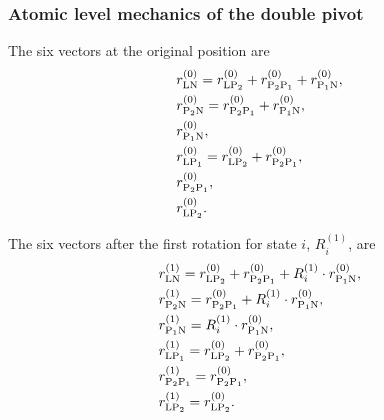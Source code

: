 
\subsubsection{Atomic level mechanics of the double pivot}

The six vectors at the original position are
\begin{subequations}
\begin{align}
    & r_{\textrm{LN}}^{(0)} = r_{\textrm{LP}_2}^{(0)} + r_{\textrm{P}_2 \textrm{P}_1}^{(0)} + r_{\textrm{P}_1 \textrm{N}}^{(0)}, \\
    & r_{\textrm{P}_2 \textrm{N}}^{(0)} = r_{\textrm{P}_2 \textrm{P}_1}^{(0)} + r_{\textrm{P}_1 \textrm{N}}^{(0)} , \\
    & r_{\textrm{P}_1 \textrm{N}}^{(0)}, \\
    & r_{\textrm{LP}_1}^{(0)} = r_{\textrm{LP}_2}^{(0)} + r_{\textrm{P}_2 \textrm{P}_1}^{(0)} , \\
    & r_{\textrm{P}_2 \textrm{P}_1}^{(0)}, \\
    & r_{\textrm{LP}_2}^{(0)} .
\end{align}
\end{subequations}

The six vectors after the first rotation for state $i$, $R_i^{(1)}$, are
\begin{subequations}
\begin{align}
    & r_{\textrm{LN}}^{(1)} = r_{\textrm{LP}_2}^{(0)} + r_{\textrm{P}_2 \textrm{P}_1}^{(0)} + R_i^{(1)} \cdot r_{\textrm{P}_1 \textrm{N}}^{(0)}, \\
    & r_{\textrm{P}_2 \textrm{N}}^{(1)} = r_{\textrm{P}_2 \textrm{P}_1}^{(0)} + R_i^{(1)} \cdot r_{\textrm{P}_1 \textrm{N}}^{(0)} , \\
    & r_{\textrm{P}_1 \textrm{N}}^{(1)} = R_i^{(1)} \cdot r_{\textrm{P}_1 \textrm{N}}^{(0)}, \\
    & r_{\textrm{LP}_1}^{(1)} = r_{\textrm{LP}_2}^{(0)} + r_{\textrm{P}_2 \textrm{P}_1}^{(0)}, \\
    & r_{\textrm{P}_2 \textrm{P}_1}^{(1)} = r_{\textrm{P}_2 \textrm{P}_1}^{(0)}, \\
    & r_{\textrm{LP}_2}^{(1)} = r_{\textrm{LP}_2}^{(0)} .
\end{align}
\end{subequations}


